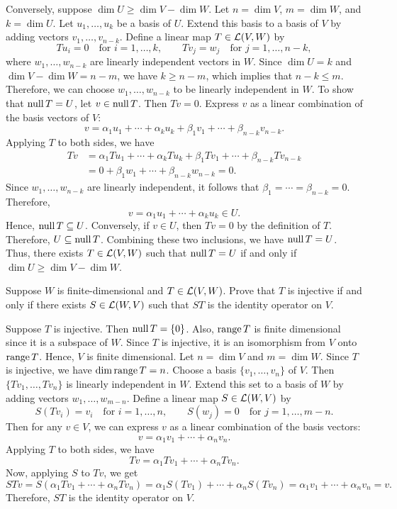 \begin{exc}
\begin{solution}
Conversely, suppose $\dim U\ge\dim V-\dim W$. Let $n=\dim V$, $m=\dim W$, and
$k=\dim U$. Let $u_1,\dots,u_k$ be a basis of $U$. Extend this basis to a
basis of $V$ by adding vectors $v_1,\dots,v_{n-k}$. Define a linear map
$T\in\mathcal{L}(V,W)$ by
\[ Tu_i=0 \quad\text{for } i=1,\dots,k, \qquad
   Tv_j=w_j \quad\text{for } j=1,\dots,n-k, \]
where $w_1,\dots,w_{n-k}$ are linearly independent vectors in $W$. Since
$\dim U=k$ and $\dim V-\dim W=n-m$, we have $k\ge n-m$, which implies that
$n-k\le m$. Therefore, we can choose $w_1,\dots,w_{n-k}$ to be linearly
independent in $W$. To show that $\operatorname{null} T=U$, let $v\in\operatorname{null} T$. Then $Tv=0$.
Express $v$ as a linear combination of the basis vectors of $V$:
\[ v=\alpha_1u_1+\cdots+\alpha_ku_k+\beta_1v_1+\cdots+\beta_{n-k}v_{n-k}. \]
Applying $T$ to both sides, we have
\begin{align*}
Tv &= \alpha_1Tu_1+\cdots+\alpha_kTu_k+\beta_1Tv_1+\cdots+\beta_{n-k}Tv_{n-k}\\
   &= 0+\beta_1w_1+\cdots+\beta_{n-k}w_{n-k}=0.
\end{align*}
Since $w_1,\dots,w_{n-k}$ are linearly independent, it follows that
$\beta_1=\cdots=\beta_{n-k}=0$. Therefore,
\[ v=\alpha_1u_1+\cdots+\alpha_ku_k\in U. \]
Hence, $\operatorname{null} T\subseteq U$. Conversely, if $v\in U$, then $Tv=0$ by the
definition of $T$. Therefore, $U\subseteq\operatorname{null} T$. Combining these two
inclusions, we have $\operatorname{null} T=U$. Thus, there exists $T\in\mathcal{L}(V,W)$ such that
$\operatorname{null} T=U$ if and only if $\dim U\ge\dim V-\dim W$.
\end{solution}

\begin{exercise}
Suppose $W$ is finite-dimensional and $T\in\mathcal{L}(V,W)$. Prove that $T$ is
injective if and only if there exists $S\in\mathcal{L}(W,V)$ such that $ST$ is the
identity operator on $V$.
\end{exercise}
\begin{solution}
Suppose $T$ is injective. Then $\operatorname{null} T=\{0\}$. Also, $\operatorname{range} T$ is finite
dimensional since it is a subspace of $W$. Since $T$ is injective, it is an
isomorphism from $V$ onto $\operatorname{range} T$. Hence, $V$ is finite dimensional. Let
$n=\dim V$ and $m=\dim W$. Since $T$ is injective, we have $\operatorname{dim}\operatorname{range} T=n$.
Choose a basis $\{v_1,\dots,v_n\}$ of $V$. Then $\{Tv_1,\dots,Tv_n\}$ is
linearly independent in $W$. Extend this set to a basis of $W$ by adding
vectors $w_1,\dots,w_{m-n}$. Define a linear map $S\in\mathcal{L}(W,V)$ by
\[ S(Tv_i)=v_i \quad\text{for } i=1,\dots,n, \qquad
   S(w_j)=0 \quad\text{for } j=1,\dots,m-n. \]
Then for any $v\in V$, we can express $v$ as a linear combination of the
basis vectors:
\[ v=\alpha_1v_1+\cdots+\alpha_nv_n. \]
Applying $T$ to both sides, we have
\[ Tv=\alpha_1Tv_1+\cdots+\alpha_nTv_n. \]
Now, applying $S$ to $Tv$, we get
\[ STv=S(\alpha_1Tv_1+\cdots+\alpha_nTv_n)=\alpha_1S(Tv_1)+\cdots
   +\alpha_nS(Tv_n)=\alpha_1v_1+\cdots+\alpha_nv_n=v. \]
Therefore, $ST$ is the identity operator on $V$.


\end{solution}
\end{exc}
